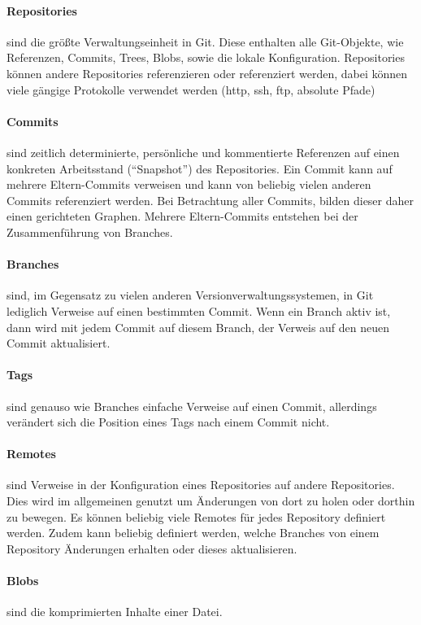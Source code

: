 \paragraph{Repositories} sind die größte Verwaltungseinheit in Git. Diese enthalten alle Git-Objekte, wie Referenzen, 
Commits, Trees, Blobs, sowie die lokale Konfiguration. Repositories können andere Repositories referenzieren oder 
referenziert werden, dabei können viele gängige Protokolle verwendet werden (http, ssh, ftp, absolute Pfade)

\paragraph{Commits} sind zeitlich determinierte, persönliche und kommentierte Referenzen auf einen konkreten Arbeitsstand 
(``Snapshot'') des Repositories. Ein Commit kann auf mehrere Eltern-Commits verweisen und kann von beliebig vielen 
anderen Commits referenziert werden. Bei Betrachtung aller Commits, bilden dieser daher einen gerichteten Graphen. 
Mehrere Eltern-Commits entstehen bei der Zusammenführung von Branches.

\paragraph{Branches} sind, im Gegensatz zu vielen anderen Versionverwaltungssystemen, in Git lediglich Verweise auf einen 
bestimmten Commit. Wenn ein Branch aktiv ist, dann wird mit jedem Commit auf diesem Branch, der Verweis auf den neuen 
Commit aktualisiert.

\paragraph{Tags} sind genauso wie Branches einfache Verweise auf einen Commit, allerdings verändert sich die Position 
eines Tags nach einem Commit nicht.

\paragraph{Remotes} sind Verweise in der Konfiguration eines Repositories auf andere Repositories. Dies wird im 
allgemeinen genutzt um Änderungen von dort zu holen oder dorthin zu bewegen. Es können beliebig viele Remotes für jedes 
Repository definiert werden. Zudem kann beliebig definiert werden, welche Branches von einem Repository Änderungen 
erhalten oder dieses aktualisieren.

\paragraph{Blobs} sind die komprimierten Inhalte einer Datei.

